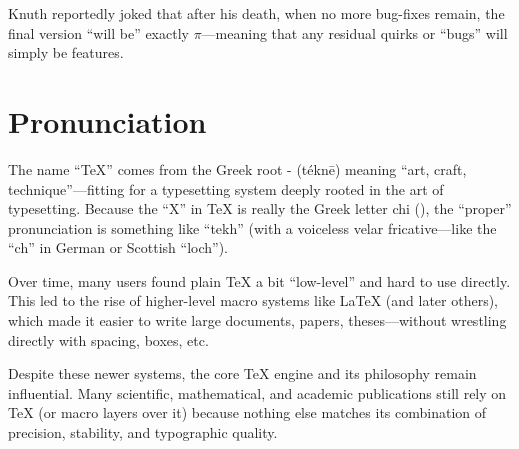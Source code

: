 \documentclass[a4paper,twoside]{article}
\begin{document}
Knuth reportedly joked that after his death, when no more bug-fixes remain, the final version \enquote{will be} exactly $\pi$---meaning that any residual quirks or \enquote{bugs} will simply be features.
\section{Pronunciation}
The name \enquote{\TeX{}} comes from the Greek root - (téknē) meaning \enquote{art, craft, technique}---fitting for a typesetting system deeply rooted in the art of typesetting. Because the \enquote{X} in \TeX{} is really the Greek letter chi (), the \enquote{proper} pronunciation is something like \enquote{tekh} (with a voiceless velar fricative---like the \enquote{ch} in German or Scottish \enquote{loch}).

Over time, many users found plain \TeX{} a bit \enquote{low-level} and hard to use directly. This led to the rise of higher-level macro systems like \LaTeX{} (and later others), which made it easier to write large documents, papers, theses---without wrestling directly with spacing, boxes, etc.

Despite these newer systems, the core \TeX{} engine and its philosophy remain influential. Many scientific, mathematical, and academic publications still rely on \TeX{} (or macro layers over it) because nothing else matches its combination of precision, stability, and typographic quality.
\end{document}

